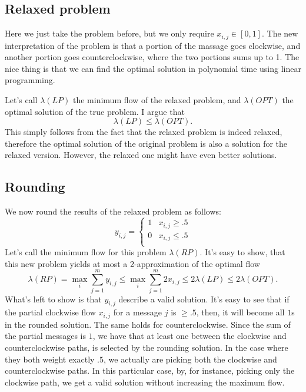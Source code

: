 \documentclass[11pt]{article}
\begin{document}
\subsection*{Relaxed problem}
Here we just take the problem before, but we only require $x_{i,j} \in [0,1]$. The new interpretation of the problem is that a portion of the massage goes clockwise, and another portion goes counterclockwise, where the two portions sums up to 1. The nice thing is that we can find the optimal solution in polynomial time using linear programming. 

Let's call $\lambda(LP)$ the minimum flow of the relaxed problem, and $\lambda(OPT)$ the optimal solution of the true problem. I argue that
\begin{equation*}
    \lambda(LP) \leq \lambda(OPT).
\end{equation*}
This simply follows from the fact that the relaxed problem is indeed relaxed, therefore the optimal solution of the original problem is also a solution for the relaxed version. However, the relaxed one might have even better solutions.
\subsection*{Rounding}
We now round the results of the relaxed problem as follows:
\begin{equation*}
    y_{i,j}=\begin{cases}
        1&x_{i,j}\geq .5\\
        0&x_{i,j}\leq .5\\
    \end{cases}
\end{equation*}
Let's call the minimum flow for this problem $\lambda(RP)$. It's easy to show, that this new problem yields at most a 2-approximation of the optimal flow
\begin{equation*}
    \lambda(RP) = \max_i \sum_{j=1}^my_{i,j} \leq \max_i \sum_{j=1}^m2x_{i,j}\leq 2\lambda(LP) \leq 2\lambda(OPT).
\end{equation*}
What's left to show is that $y_{i,j}$ describe a valid solution. It's easy to see that if the partial clockwise flow $x_{i,j}$ for a message $j$ is $\geq .5$, then, it will become all $1$s in the rounded solution. The same holds for counterclockwise. Since the sum of the partial messages is $1$, we have that at least one between the clockwise and counterclockwise paths, is selected by the rounding solution. In the case where they both weight exactly $.5$, we actually are picking both the clockwise and counterclockwise paths. In this particular case, by, for instance, picking only the clockwise path, we get a valid solution without increasing the maximum flow.
\end{document}
